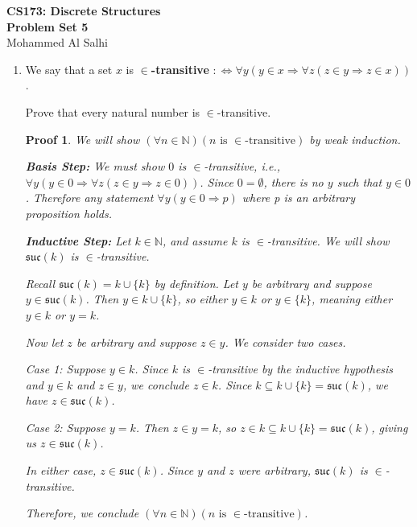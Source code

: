 \documentclass[12pt]{article}
\newcommand{\defn}[1]{\textbf{#1}}
\newcommand{\suc}{\mathfrak{suc}}
\newcommand{\N}{\mathbb{N}}
\theoremstyle{proofstyle}
\newtheorem*{proof*}{Proof}
\renewcommand{\maketitle}{%
  \begin{flushleft}
    {\Large\bfseries CS173: Discrete Structures}\\[0.3em]
    {\Large\bfseries Problem Set 5}\\[0.5em]
    {\normalsize Mohammed Al Salhi}
  \end{flushleft}
  \vspace{1em}
}
\begin{document}
\maketitle

\begin{enumerate}[left=0pt, itemsep=2em, parsep=1em]

\item We say that a set $x$ is \defn{$\in$-transitive} $:\Leftrightarrow \forall y(y \in x \Rightarrow \forall z(z \in y \Rightarrow z \in x))$.

Prove that every natural number is $\in$-transitive.

\begin{proof*}
We will show $(\forall n \in \N)(n \text{ is } {\in}\text{-transitive})$ by weak induction.

\medskip
\textbf{Basis Step:}
We must show $0$ is $\in$-transitive, i.e., $\forall y(y \in 0 \Rightarrow \forall z(z \in y \Rightarrow z \in 0))$. Since $0 = \emptyset$, there is no $y$ such that $y \in 0$. Therefore any statement $\forall y(y \in 0 \Rightarrow p)$ where p is an arbitrary proposition holds.

\medskip
\textbf{Inductive Step:}
Let $k \in \N$, and assume $k$ is $\in$-transitive. We will show $\suc(k)$ is $\in$-transitive.

Recall $\suc(k) = k \cup \{k\}$ by definition. Let $y$ be arbitrary and suppose $y \in \suc(k)$. Then $y \in k \cup \{k\}$, so either $y \in k$ or $y \in \{k\}$, meaning either $y \in k$ or $y = k$.

Now let $z$ be arbitrary and suppose $z \in y$. We consider two cases.

\medskip
\textit{Case 1:} Suppose $y \in k$. Since $k$ is $\in$-transitive by the inductive hypothesis and $y \in k$ and $z \in y$, we conclude $z \in k$. Since $k \subseteq k \cup \{k\} = \suc(k)$, we have $z \in \suc(k)$.

\medskip
\textit{Case 2:} Suppose $y = k$. Then $z \in y = k$, so $z \in k \subseteq k \cup \{k\} = \suc(k)$, giving us $z \in \suc(k)$.

\medskip
In either case, $z \in \suc(k)$. Since $y$ and $z$ were arbitrary, $\suc(k)$ is $\in$-transitive.

Therefore, we conclude $(\forall n \in \N)(n \text{ is } {\in}\text{-transitive})$.
\end{proof*}


\end{enumerate}
\end{document}
